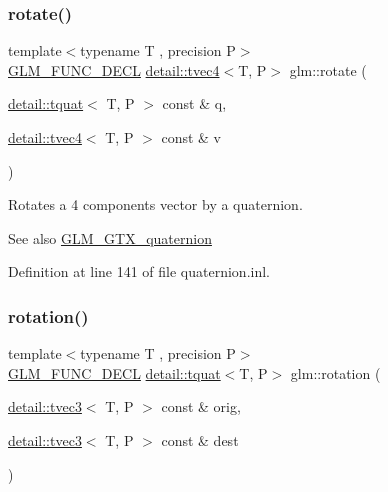\subsubsection{\texorpdfstring{rotate()}{rotate()}\hspace{0.1cm}{\footnotesize\ttfamily [2/2]}}
{\footnotesize\ttfamily template$<$typename T , precision P$>$ \\
\hyperlink{setup_8hpp_ab2d052de21a70539923e9bcbf6e83a51}{G\+L\+M\+\_\+\+F\+U\+N\+C\+\_\+\+D\+E\+CL} \hyperlink{structglm_1_1detail_1_1tvec4}{detail\+::tvec4}$<$T, P$>$ glm\+::rotate (\begin{DoxyParamCaption}\item[{\hyperlink{structglm_1_1detail_1_1tquat}{detail\+::tquat}$<$ T, P $>$ const \&}]{q,  }\item[{\hyperlink{structglm_1_1detail_1_1tvec4}{detail\+::tvec4}$<$ T, P $>$ const \&}]{v }\end{DoxyParamCaption})}

Rotates a 4 components vector by a quaternion.

\begin{DoxySeeAlso}{See also}
\hyperlink{group__gtx__quaternion}{G\+L\+M\+\_\+\+G\+T\+X\+\_\+quaternion} 
\end{DoxySeeAlso}


Definition at line 141 of file quaternion.\+inl.

\mbox{\label{group__gtx__quaternion_ga964b26fdcd9f6f694c1003b0571092a6}} 
\subsubsection{\texorpdfstring{rotation()}{rotation()}}
{\footnotesize\ttfamily template$<$typename T , precision P$>$ \\
\hyperlink{setup_8hpp_ab2d052de21a70539923e9bcbf6e83a51}{G\+L\+M\+\_\+\+F\+U\+N\+C\+\_\+\+D\+E\+CL} \hyperlink{structglm_1_1detail_1_1tquat}{detail\+::tquat}$<$T, P$>$ glm\+::rotation (\begin{DoxyParamCaption}\item[{\hyperlink{structglm_1_1detail_1_1tvec3}{detail\+::tvec3}$<$ T, P $>$ const \&}]{orig,  }\item[{\hyperlink{structglm_1_1detail_1_1tvec3}{detail\+::tvec3}$<$ T, P $>$ const \&}]{dest }\end{DoxyParamCaption})}

